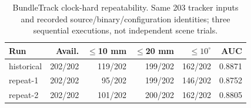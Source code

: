 \begin{table}[t]\centering\scriptsize
\caption{BundleTrack clock-hard repeatability. Same 203 tracker inputs and recorded source/binary/configuration identities; three sequential executions, not independent scene trials.}
\label{tab:bt-repeat}
\begin{tabular}{lrrrrr}\toprule
Run & Avail. & $\leq$10 mm & $\leq$20 mm & $\leq10^\circ$ & AUC\\\midrule
historical & 202/202 & 119/202 & 199/202 & 162/202 & 0.8871\\
repeat-1 & 202/202 & 95/202 & 199/202 & 146/202 & 0.8752\\
repeat-2 & 202/202 & 101/202 & 200/202 & 162/202 & 0.8805\\
\bottomrule\end{tabular}\end{table}
